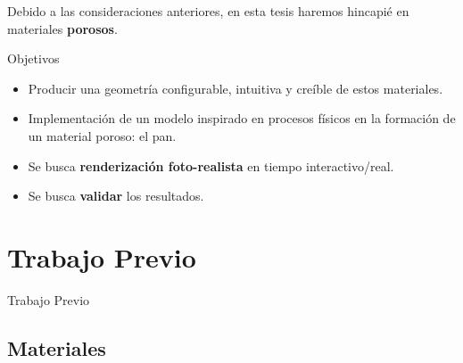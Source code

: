 \documentclass[spanish,unknownkeysallowed]{beamer}
\begin{document}
\begin{frame}
\begin{block}{}
Debido a las consideraciones anteriores, en esta tesis haremos hincapié en materiales \textbf{porosos}.

Objetivos
\begin{itemize}
\item Producir una geometría configurable, intuitiva y creíble de estos materiales.
\item Implementación de un modelo inspirado en procesos físicos en la formación de un material poroso: el pan.
\item Se busca \textbf{renderización foto-realista} en tiempo interactivo/real.
\item Se busca \textbf{validar} los resultados.
\end{itemize}



\end{block}
\end{frame}




\section{Trabajo Previo}

\begin{frame}
\begin{block}{}
\begin{center}
\vspace{1cm}
\huge{Trabajo Previo}
\vspace{1cm}
\end{center}
\end{block}
\end{frame}

\subsection{Materiales}
\end{document}
